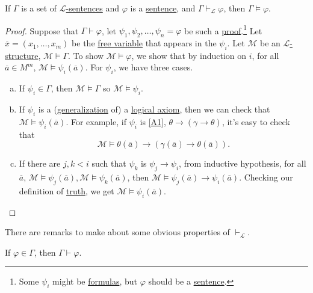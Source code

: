 \begin{lemma}[Soundness]\label{lma:soundness}
	If \(\Gamma \) is a set of \hyperref[def:sentence]{\(\mathcal{L} \)-sentences} and \(\varphi \) is a \hyperref[def:sentence]{sentence}, and \(\Gamma \vdash _{\mathcal{L} } \varphi \), then \(\Gamma \models \varphi \).
\end{lemma}
\begin{proof}
	Suppose that \(\Gamma \vdash \varphi \), let \(\psi _1, \psi _2, \ldots , \psi _n = \varphi \) be such a \hyperref[def:proof]{proof}.\footnote{Some \(\psi _i\) might be \hyperref[def:formula]{formulas}, but \(\varphi \) should be a \hyperref[def:sentence]{sentence}.} Let \(\overline{x} = (x_1, \ldots , x_m)\) be the \hyperref[def:free-variable]{free variable} that appears in the \(\psi _i\). Let \(\mathcal{M} \) be an \hyperref[def:structure]{\(\mathcal{L} \)-structure}, \(\mathcal{M} \models \Gamma \). To show \(\mathcal{M} \models \varphi \), we show that by induction on \(i\), for all \(\overline{a} \in M^m\), \(\mathcal{M} \models \psi _i(\overline{a} )\). For \(\psi _i\), we have three cases.
	\begin{enumerate}[(a)]
		\item If \(\psi _i\in \Gamma \), then \(\mathcal{M} \models \Gamma \) so \(\mathcal{M} \models \psi _i\).
		\item If \(\psi _i\) is a (\hyperref[def:generalization]{generalization} of) a \hyperref[def:logical-axioms]{logical axiom}, then we can check that \(\mathcal{M} \models \psi _i(\overline{a} )\). For example, if \(\psi _i\) is \autoref{A1}, \(\theta \to (\gamma \to \theta )\), it's easy to check that
		      \[
			      \mathcal{M} \models \theta (\overline{a} ) \to  (\gamma (\overline{a} ) \to \theta (\overline{a} )).
		      \]
		\item If there are \(j, k < i\) such that \(\psi _k\) is \(\psi _j \to \psi _i\), from inductive hypothesis, for all \(\overline{a} \), \(\mathcal{M} \models \psi _j(\overline{a} ), \mathcal{M} \models \psi _k(\overline{a} )\), then \(\mathcal{M} \models \psi _j(\overline{a} ) \to \psi _i(\overline{a} )\). Checking our definition of \hyperref[def:truth]{truth}, we get \(\mathcal{M} \models \psi _i(\overline{a} )\).
	\end{enumerate}
\end{proof}

There are remarks to make about some obvious properties of \(\vdash _{\mathcal{L} }\).

\begin{remark}
	If \(\varphi \in \Gamma \), then \(\Gamma \vdash \varphi \).
\end{remark}

